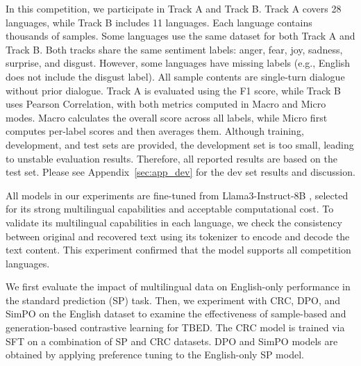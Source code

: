 \documentclass[11pt]{article}
\begin{document}
In this competition, we participate in Track A and Track B. Track A covers 28 languages, while Track B includes 11 languages. Each language contains thousands of samples. Some languages use the same dataset for both Track A and Track B. Both tracks share the same sentiment labels: anger, fear, joy, sadness, surprise, and disgust. However, some languages have missing labels (e.g., English does not include the disgust label). All sample contents are single-turn dialogue without prior dialogue. Track A is evaluated using the F1 score, while Track B uses Pearson Correlation, with both metrics computed in Macro and Micro modes. Macro calculates the overall score across all labels, while Micro first computes per-label scores and then averages them. Although training, development, and test sets are provided, the development set is too small, leading to unstable evaluation results. Therefore, all reported results are based on the test set. Please see Appendix~\ref{sec:app_dev} for the dev set results and discussion.


All models in our experiments are fine-tuned from Llama3-Instruct-8B \cite{dubey2024llama}, selected for its strong multilingual capabilities and acceptable computational cost. To validate its multilingual capabilities in each language, we check the consistency between original and recovered text using its tokenizer to encode and decode the text content. This experiment confirmed that the model supports all competition languages.


We first evaluate the impact of multilingual data on English-only performance in the standard prediction (SP) task. Then, we experiment with CRC, DPO, and SimPO on the English dataset to examine the effectiveness of sample-based and generation-based contrastive learning for TBED. The CRC model is trained via SFT on a combination of SP and CRC datasets. DPO and SimPO models are obtained by applying preference tuning to the English-only SP model.
\end{document}
